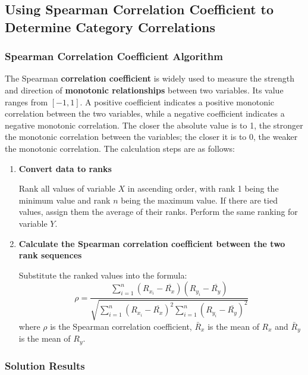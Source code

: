 \documentclass{article}
\begin{document}
	\subsection{Using Spearman Correlation Coefficient to Determine Category Correlations}
	
	\subsubsection{Spearman Correlation Coefficient Algorithm}
	
	The Spearman \textbf{correlation coefficient} is widely used to measure the strength and direction of \textbf{monotonic relationships} between two variables. Its value ranges from \([-1,1]\). A positive coefficient indicates a positive monotonic correlation between the two variables, while a negative coefficient indicates a negative monotonic correlation. The closer the absolute value is to 1, the stronger the monotonic correlation between the variables; the closer it is to 0, the weaker the monotonic correlation. The calculation steps are as follows:
	
	\begin{enumerate}[label=\arabic*., leftmargin=*]
		\item \textbf{Convert data to ranks}
		
		Rank all values of variable \(X\) in ascending order, with rank 1 being the minimum value and rank \(n\) being the maximum value. If there are tied values, assign them the average of their ranks. Perform the same ranking for variable \(Y\).
		
		\item \textbf{Calculate the Spearman correlation coefficient between the two rank sequences}
		
		Substitute the ranked values into the formula:
		\begin{equation}
			\rho = \frac{\sum_{i=1}^{n} \left(R_{x_i} - \overline{R_x}\right) \left(R_{y_i} - \overline{R_y}\right)}
			{\sqrt{\sum_{i=1}^{n} \left(R_{x_i} - \overline{R_x}\right)^2 \sum_{i=1}^{n} \left(R_{y_i} - \overline{R_y}\right)^2}}
			\label{eq:spearman_correlation}
		\end{equation}
		where \(\rho\) is the Spearman correlation coefficient, $\bar{R}_x$ is the mean of $R_x$ and $\bar{R}_y$ is the mean of $R_y$.
	\end{enumerate}
	
	\subsubsection{Solution Results}
	
\end{document}
